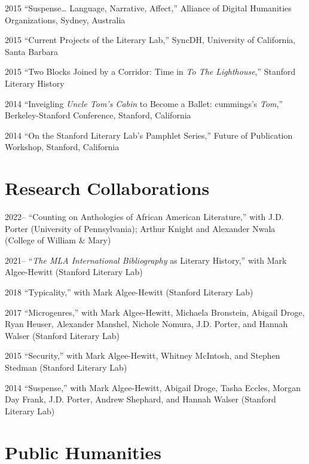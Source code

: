 \documentclass[12pt,letterpaper]{report}
\begin{document}
\begin{tablist}
	\item[2015] \tab{}\enquote{Suspense… Language, Narrative, Affect,} Alliance of Digital Humanities Organizations, Sydney, Australia
	\item[2015] \tab{}\enquote{Current Projects of the Literary Lab,} SyncDH, University of California, Santa Barbara
	\item[2015] \tab{}\enquote{Two Blocks Joined by a Corridor: Time in \emph{To The Lighthouse},} Stanford Literary History
	\item[2014] \tab{}\enquote{Inveigling \emph{Uncle Tom's Cabin} to Become a Ballet: cummings's \emph{Tom},} Berkeley-Stanford Conference, Stanford, California
	\item[2014] \tab{}\enquote{On the Stanford Literary Lab's Pamphlet Series,} Future of Publication Workshop, Stanford, California
\end{tablist}


\section*{Research Collaborations}

\begin{tablist}
	\item[2022--] \tab{}\enquote{Counting on Anthologies of African American Literature,} with J.D. Porter (University of Pennsylvania); Arthur Knight and Alexander Nwala (College of William \& Mary)
	\item[2021--] \tab{}\enquote{\emph{The MLA International Bibliography} as Literary History,} with Mark Algee-Hewitt (Stanford Literary Lab)
	\item[2018] \tab{}\enquote{Typicality,} with Mark Algee-Hewitt (Stanford Literary Lab)
	\item[2017] \tab{}\enquote{Microgenres,} with Mark Algee-Hewitt, Michaela Bronstein, Abigail Droge, Ryan Heuser, Alexander Manshel, Nichole Nomura, J.D. Porter, and Hannah Walser (Stanford Literary Lab)
	\item[2015] \tab{}\enquote{Security,} with Mark Algee-Hewitt, Whitney McIntosh, and Stephen Stedman (Stanford Literary Lab)
	\item[2014] \tab{}\enquote{Suspense,} with Mark Algee-Hewitt, Abigail Droge, Tasha Eccles, Morgan Day Frank, J.D. Porter, Andrew Shephard, and Hannah Walser (Stanford Literary Lab)
\end{tablist}

\section*{Public Humanities}
\end{document}
